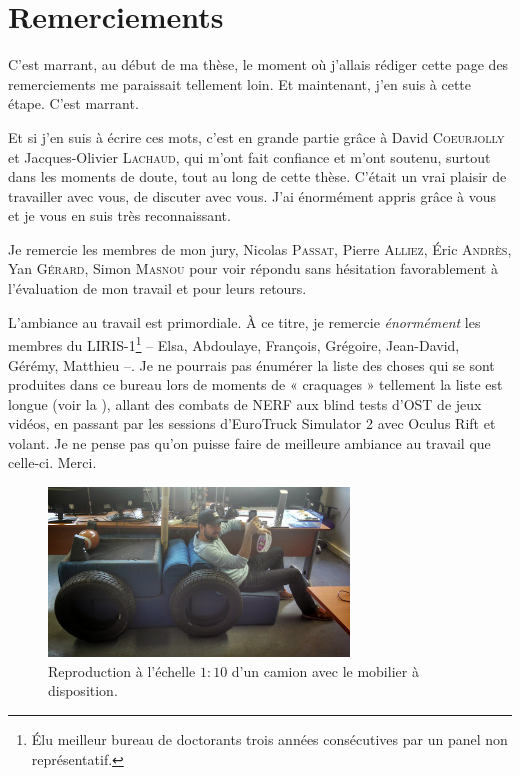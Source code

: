 \chapter*{Remerciements}
\label{sec:remerciements}
\vspace*{-10mm}


C'est marrant, au début de ma thèse, le moment où j'allais rédiger cette page
des remerciements me paraissait tellement loin. Et maintenant, j'en suis à cette
étape. C'est marrant.

Et si j'en suis à écrire ces mots, c'est en grande partie grâce à David
\textsc{Coeurjolly} et Jacques-Olivier \textsc{Lachaud}, qui m'ont fait
confiance et m'ont soutenu, surtout dans les moments de doute, tout au long de
cette thèse. C'était un vrai plaisir de travailler avec vous, de discuter avec
vous. J'ai énormément appris grâce à vous et je vous en suis très reconnaissant.

Je remercie les membres de mon jury, Nicolas \textsc{Passat}, Pierre
\textsc{Alliez}, Éric \textsc{Andrès}, Yan \textsc{Gérard}, Simon
\textsc{Masnou} pour voir répondu sans hésitation favorablement à l'évaluation
de mon travail et pour leurs retours.

L'ambiance au travail est primordiale. À ce titre, je remercie \emph{énormément}
les membres du LIRIS-1\footnote{Élu meilleur bureau de doctorants trois années
consécutives par un panel non représentatif.} -- Elsa, Abdoulaye, François,
Grégoire, Jean-David, Gérémy, Matthieu --. Je ne pourrais pas énumérer la liste
des choses qui se sont produites dans ce bureau lors de moments de « craquages »
tellement la liste est longue (voir la ),
allant des combats de NERF aux blind tests d'OST de jeux vidéos, en passant par
les sessions d'EuroTruck Simulator 2 avec Oculus Rift et volant. Je ne pense pas
qu'on puisse faire de meilleure ambiance au travail que celle-ci. Merci.
%
\begin{figure}[ht]{
  \begin{center}
    \includegraphics[width=8cm]{images/misc/JeremInTheTruck}
  \end{center}
  \caption{Reproduction à l'échelle $1:10$ d'un camion avec le mobilier à disposition.\label{fig:jerem-in-the-truck}}}
\end{figure}

